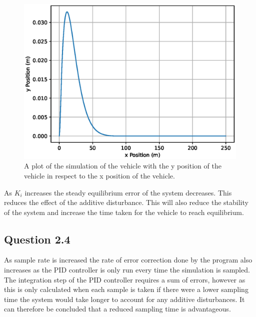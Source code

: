 \documentclass[a4paper,10pt,reqno]{amsart}
\numberwithin{equation}{section}
\begin{document}
        \begin{figure}[h]
            \centering
            \includegraphics[width=0.6\linewidth]{figures/question_2_3_b.eps}
            \caption{A plot of the simulation of the vehicle with the y position of the vehicle in respect to the x position of the vehicle.}
        \end{figure}
        
        As \(K_i\) increases the steady equilibrium error of the system decreases. This reduces the effect of the additive disturbance. This will also reduce the stability of the system and increase the time taken for the vehicle to reach equilibrium.
        
    \subsection{Question 2.4}
        As sample rate is increased the rate of error correction done by the program also increases as the PID controller is only run every time the simulation is sampled. The integration step of the PID controller requires a sum of errors, however as this is only calculated when each sample is taken if there were a lower sampling time the system would take longer to account for any additive disturbances. It can therefore be concluded that a reduced sampling time is advantageous.
\end{document}
